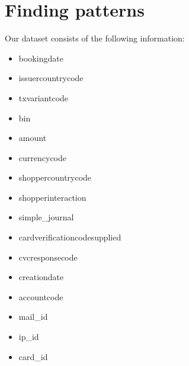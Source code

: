 \section*{Finding patterns}

Our dataset consists of the following information:

\begin{itemize}
	\item bookingdate
	\item issuercountrycode
	\item txvariantcode
	\item bin
	\item amount
	\item currencycode
	\item shoppercountrycode
	\item shopperinteraction
	\item simple_journal
	\item cardverificationcodesupplied
	\item cvcresponsecode
	\item creationdate
	\item accountcode
	\item mail_id
	\item ip_id
	\item card_id
\end{itemize}